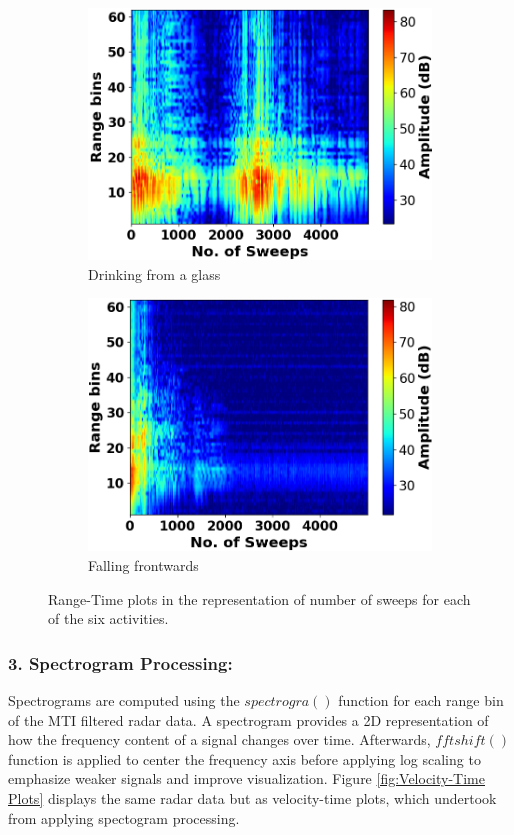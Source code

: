 \documentclass{l4proj}
\begin{document}
\begin{figure}[h]
\begin{subfigure}[b]{0.32\textwidth}
        \includegraphics[width=\textwidth]{images/Range-Sweep_5.png}
        \caption{Drinking from a glass}
        \label{fig:range-sweep5}
    \end{subfigure}
    \hfill
    \begin{subfigure}[b]{0.32\textwidth}
        \includegraphics[width=\textwidth]{images/Range-Sweep_6.png}
        \caption{Falling frontwards}
        \label{fig:range-sweep6}
    \end{subfigure}
  \caption{Range-Time plots in the representation of number of sweeps for each of the six activities.}
  \label{fig:Range-Sweep Plots}
\end{figure}

\subsubsection{3. Spectrogram Processing:}
Spectrograms are computed using the $spectrogra()$ function for each range bin of the MTI filtered radar data. A spectrogram provides a 2D representation of how the frequency content of a signal changes over time. Afterwards, $fftshift()$ function is applied to center the frequency axis before applying log scaling to emphasize weaker signals and improve visualization. Figure \ref{fig:Velocity-Time Plots} displays the same radar data but as velocity-time plots, which undertook from applying spectogram processing.
\end{document}
